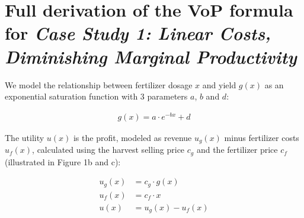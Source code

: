\hypertarget{full-derivation-of-the-vop-formula-for-case-study-1-linear-costs-diminishing-marginal-productivity}{%
\section*{\texorpdfstring{Full derivation of the VoP formula for \emph{Case Study 1: Linear Costs, Diminishing Marginal Productivity}}{Full derivation of the VoP formula for Case Study 1: Linear Costs, Diminishing Marginal Productivity}}\label{full-derivation-of-the-vop-formula-for-case-study-1-linear-costs-diminishing-marginal-productivity}}

We model the relationship between fertilizer dosage $x$ and yield $g(x)$ as an exponential saturation function with 3 parameters $a$, $b$ and $d$:

\begin{align}
g(x) = a \cdot e^{-b x} + d
\end{align}

The utility $u(x)$ is the profit, modeled as revenue $u_g(x)$ minus fertilizer costs $u_f(x)$, calculated using the harvest selling price $c_g$ and the fertilizer price $c_f$ (illustrated in Figure 1b and c):

\begin{align}
    u_g(x) &= c_g \cdot g(x) \\
    u_f(x) &= c_f \cdot x\\
    u(x) &= u_g(x) - u_f(x)
\end{align}

